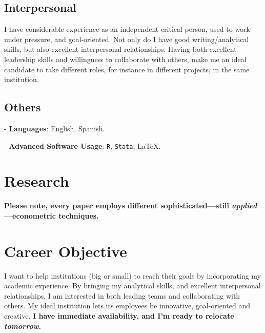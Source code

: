 \documentclass[letterpaper]{article}
\renewenvironment{itemize}{
  \begin{list}{}{
    \setlength{\leftmargin}{1.5em}
  }
}{
  \end{list}
}
\begin{document}
\subsection*{Interpersonal}
I have considerable experience as an independent critical person, used to work under pressure, and goal-oriented. Not only do I have good writing/analytical skills, but also excellent interpersonal relationships. Having both excellent leadership skills and willingness to collaborate with others, make me an ideal candidate to take different roles, for instance in different projects, in the same institution. 





\subsection*{Others}
\begin{itemize}
	\item- {\bf Languages}: English, Spanish.
	\item- {\bf Advanced Software Usage}: \texttt{R}, \texttt{Stata}, \LaTeX.
\end{itemize}


\section*{Research}

{\bf Please note, every paper employs different sophisticated---still \emph{applied}---econometric techniques.}

{}



\section*{Career Objective}

I want to help institutions (big or small) to reach their goals by incorporating my academic experience. By bringing my analytical skills, and excellent interpersonal relationships, I am interested in both leading teams and collaborating with others. My ideal institution lets its employees be innovative, goal-oriented and creative. {\bf I have immediate availability, and I'm ready to relocate \emph{tomorrow}.}
\end{document}
